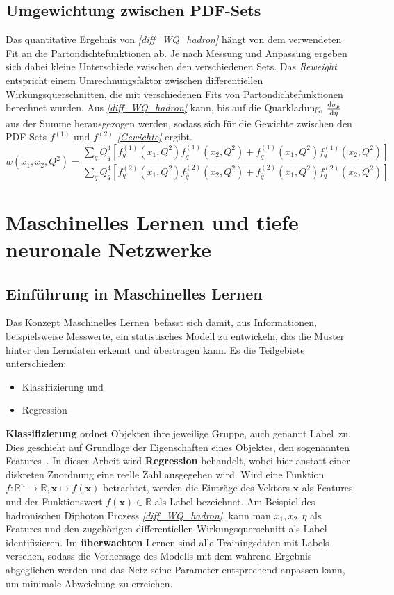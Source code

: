 \section{Umgewichtung zwischen PDF-Sets}
Das quantitative Ergebnis von \textit{\autoref{diff_WQ_hadron}} hängt von dem verwendeten Fit an die Partondichtefunktionen ab. Je nach Messung und Anpassung ergeben sich dabei kleine Unterschiede zwischen den verschiedenen Sets. Das \textit{Reweight} entspricht einem Umrechnungsfaktor zwischen differentiellen Wirkungsquerschnitten, die mit verschiedenen Fits von Partondichtefunktionen berechnet wurden. Aus \textit{\autoref{diff_WQ_hadron}} kann, bis auf die Quarkladung,  $\derivative{\sigma_p}{\eta}$ aus der Summe herausgezogen werden, sodass sich für die Gewichte zwischen den PDF-Sets $f^{(1)}$ und $f^{(2)}$ \textit{\autoref{Gewichte}} ergibt.
\begin{equation}
w\left(x_1, x_2, Q^2\right) = \frac{ \sum_{q} Q_q^4 \left[f_q^{(1)}(x_1, Q^2)f_{\overline{q}}^{(1)}(x_2, Q^2) +f_{\overline{q}}^{(1)}(x_1, Q^2)f_{q}^{(1)}(x_2, Q^2) \right]}{\sum_{q} Q_q^4 \left[f_q^{(2)}(x_1, Q^2)f_{\overline{q}}^{(2)}(x_2, Q^2) +f_{\overline{q}}^{(2)}(x_1, Q^2)f_{q}^{(2)}(x_2, Q^2) \right]}
\label{Gewichte}
\end{equation}
\chapter{Maschinelles Lernen und tiefe neuronale Netzwerke}
\label{3}
\section{Einführung in Maschinelles Lernen}
Das Konzept \glqq Maschinelles Lernen\grqq~befasst sich damit, aus Informationen, beispielsweise Messwerte, ein statistisches Modell zu entwickeln, das die Muster hinter den Lerndaten erkennt und übertragen kann. Es die Teilgebiete unterschieden:
\begin{itemize}
	\setlength\itemsep{0.1cm}
	\setlength{\parskip}{0.1cm}
	\item Klassifizierung und 
	\item Regression
\end{itemize}
\textbf{Klassifizierung} ordnet Objekten ihre jeweilige Gruppe, auch genannt \glqq Label\grqq~zu. Dies geschieht auf Grundlage der Eigenschaften eines Objektes, den sogenannten \glqq Features\grqq~.
In dieser Arbeit wird \textbf{Regression} behandelt, wobei hier anstatt einer diskreten Zuordnung eine reelle Zahl ausgegeben wird. Wird eine Funktion $f: \mathbb{R}^n \rightarrow \mathbb{R}, \mathbf{x} \mapsto f(\mathbf{x})$ betrachtet, werden die Einträge des Vektors $\mathbf{x}$ als Features und der Funktionswert $f(\mathbf{x}) \in \mathbb{R}$ als Label bezeichnet. Am Beispiel des hadronischen Diphoton Prozess \textit{\autoref{diff_WQ_hadron}}, kann man $x_1, x_2, \eta$ als Features und den zugehörigen differentiellen Wirkungsquerschnitt als Label identifizieren. 
Im \textbf{überwachten} Lernen sind alle Trainingsdaten mit Labels versehen, sodass die Vorhersage des Modells mit dem wahrend Ergebnis abgeglichen werden und das Netz seine Parameter entsprechend anpassen kann, um minimale Abweichung zu erreichen. 

